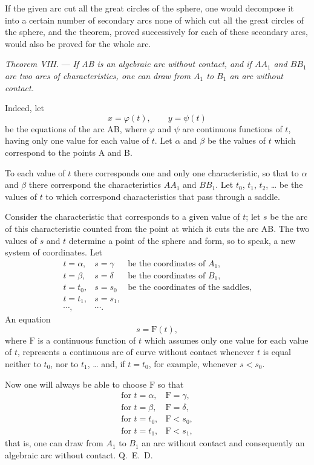 \documentclass[11pt]{article}
\begin{document}
If the given arc cut all the great circles of the sphere, one would decompose it into a certain number of secondary arcs none of which cut all the great circles of the sphere, and the theorem, proved successively for each of these secondary arcs, would also be proved for the whole arc.

\emph{Theorem VIII.} --- \emph{If AB is an algebraic arc without contact, and if $AA_1$ and $BB_1$ are two arcs of characteristics, one can draw from $A_1$ to $B_1$ an arc without contact.}

Indeed, let
\[
x=\varphi(t),
\qquad
 y=\psi(t)
\]
be the equations of the arc AB, where $\varphi$ and $\psi$ are continuous functions of $t$, having only one value for each value of $t$. Let $\alpha$ and $\beta$ be the values of $t$ which correspond to the points A and B.

To each value of $t$ there corresponds one and only one characteristic, so that to $\alpha$ and $\beta$ there correspond the characteristics $AA_1$ and $BB_1$. Let $t_0$, $t_1$, $t_2$, \dots{} be the values of $t$ to which correspond characteristics that pass through a saddle.

Consider the characteristic that corresponds to a given value of $t$; let $s$ be the arc of this characteristic counted from the point at which it cuts the arc AB. The two values of $s$ and $t$ determine a point of the sphere and form, so to speak, a new system of coordinates. Let
\[
\begin{array}{lll}
t=\alpha, & s=\gamma & \text{be the coordinates of } A_1,\\
t=\beta,  & s=\delta & \text{be the coordinates of } B_1,\\
t=t_0,    & s=s_0    & \text{be the coordinates of the saddles,}\\
t=t_1,    & s=s_1,   & \\
\cdots,   & \cdots.&
\end{array}
\]
An equation
\[
s=\mathrm F(t),
\]
where $\mathrm F$ is a continuous function of $t$ which assumes only one value for each value of $t$, represents a continuous arc of curve without contact whenever $t$ is equal neither to $t_0$, nor to $t_1$, \dots{} and, if $t=t_0$, for example, whenever $s<s_0$.

Now one will always be able to choose $\mathrm F$ so that
\[
\begin{array}{ll}
\text{for } t=\alpha, & \mathrm F=\gamma,\\
\text{for } t=\beta,  & \mathrm F=\delta,\\
\text{for } t=t_0,    & \mathrm F<s_0,\\
\text{for } t=t_1,    & \mathrm F<s_1,
\end{array}
\]
that is, one can draw from $A_1$ to $B_1$ an arc without contact and consequently an algebraic arc without contact. \hfill\mbox{Q. E. D.}
\end{document}
